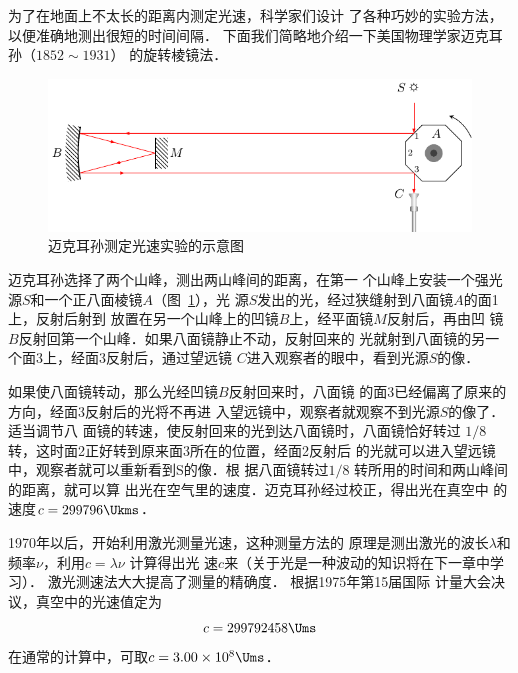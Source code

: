 为了在地面上不太长的距离内测定光速，科学家们设计
了各种巧妙的实验方法，以便准确地测出很短的时间间隔．
下面我们简略地介绍一下美国物理学家迈克耳孙（$1852 \sim 1931$）
的旋转棱镜法．
\begin{figure}[htbp]
    \centering
    \includegraphics{fig/C/5-5.pdf}
    \caption{迈克耳孙测定光速实验的示意图}\label{fig_C_5-5}
\end{figure}

迈克耳孙选择了两个山峰，测出两山峰间的距离，在第一
个山峰上安装一个强光源$S$和一个正八面棱镜$A$（图~\ref{fig_C_5-5}），光
源$S$发出的光，经过狭缝射到八面镜$A$的面1上，反射后射到
放置在另一个山峰上的凹镜$B$上，经平面镜$M$反射后，再由凹
镜$B$反射回第一个山峰．如果八面镜静止不动，反射回来的
光就射到八面镜的另一个面3上，经面3反射后，通过望远镜
$C$进入观察者的眼中，看到光源$S$的像．

如果使八面镜转动，那么光经凹镜$B$反射回来时，八面镜
的面3已经偏离了原来的方向，经面3反射后的光将不再进
入望远镜中，观察者就观察不到光源$S$的像了．适当调节八
面镜的转速，使反射回来的光到达八面镜时，八面镜恰好转过
$1/8$转，这时面2正好转到原来面3所在的位置，经面2反射后
的光就可以进入望远镜中，观察者就可以重新看到S的像．根
据八面镜转过$1/8$
转所用的时间和两山峰间的距离，就可以算
出光在空气里的速度．迈克耳孙经过校正，得出光在真空中
的速度$c=299796 \Ukms$．

1970年以后，开始利用激光测量光速，这种测量方法的
原理是测出激光的波长$\lambda$和频率$\nu$，利用$c=\lambda\nu$ 计算得出光
速$c$来（关于光是一种波动的知识将在下一章中学习）．
激光测速法大大提高了测量的精确度．
根据1975年第15届国际
计量大会决议，真空中的光速值定为
$$c=299792458\Ums$$
在通常的计算中，可取$c=3.00\times10^8\Ums$．

